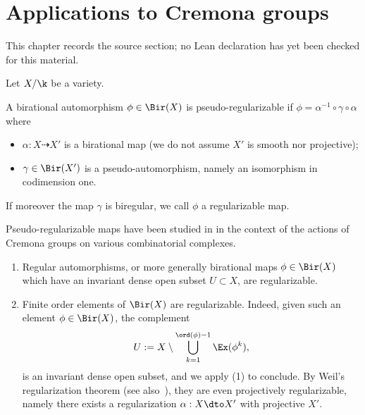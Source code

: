 \chapter{Applications to Cremona groups}
\label{motivic-invariants-birational-maps-chapter-04}

\begin{remark}
\label{motivic-invariants-birational-maps-chapter-04-source}
This chapter records the source section; no Lean declaration has yet been checked for this material.
\notready
\end{remark}

\label{sec:cremona}

Let $X/\k$ be a variety.

\begin{definition}
\notready\label{Def-reg}
A birational automorphism $\phi \in \Bir(X)$ is pseudo-regularizable
if $\phi = \alpha^{-1} \circ \gamma \circ \alpha$ where
\begin{itemize}
    \item $\alpha: X \dashrightarrow X'$ is a birational map
    (we do not assume $X'$ is smooth nor projective);
    \item $\gamma \in \Bir(X')$ is a pseudo-automorphism, namely
    an isomorphism in codimension one.
\end{itemize}

If moreover the map $\gamma$
is biregular, we call $\phi$ a regularizable map.
\end{definition}

Pseudo-regularizable maps have been
studied in \cite{Cantat-Cornulier,Lonjou-Urech}
in the context of the actions of Cremona
groups on various combinatorial complexes.

\begin{example}
\notready \label{ex-regbir}
\begin{enumerate}
    \item Regular automorphisms, or more generally
birational maps
$\phi \in \Bir(X)$ which have an invariant dense open subset
$U \subset X$, are regularizable.
\item Finite order elements of $\Bir(X)$ are regularizable.
Indeed, given such
an element $\phi \in \Bir(X)$, the complement
\[
U := X \setminus \bigcup_{k = 1}^{\ord(\phi)-1} \Ex(\phi^k),
\]
is an invariant dense open subset, and
we apply (1) to conclude.
By Weil's regularization theorem (see also~\cite{Kraft}),
they are even projectively regularizable,
namely there exists a regularization $\alpha : X \dto X'$
with projective $X'$.
\end{enumerate}
\end{example}


